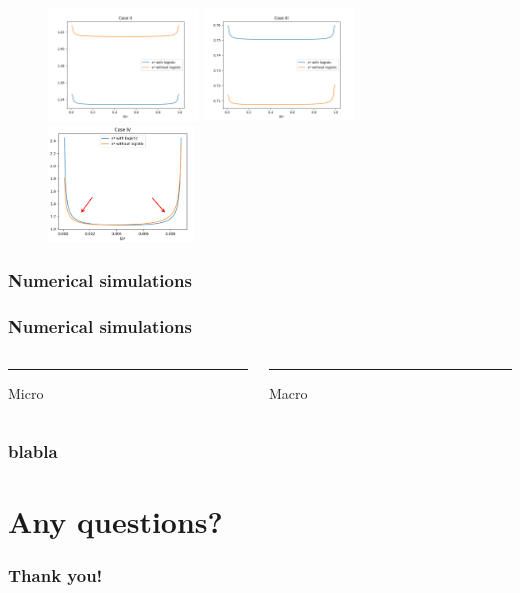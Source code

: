 \documentclass[10pt]{beamer}
\theoremstyle{remark}
\begin{document}
\begin{frame}
\begin{figure}
\includegraphics[width=4cm]{sstar_caseII}
\includegraphics[width=4cm]{sstar_caseIII}
\includegraphics[width=3.9cm]{caseIVmodi}

\end{figure}






\end{frame}




\begin{frame}
\frametitle{Numerical simulations}
\end{frame}


\begin{frame}
\frametitle{Numerical simulations}
\begin{columns}[T] %
	\begin{column}{.48\textwidth}
		\color{orange}\rule{\linewidth}{4pt}
		
		Micro
	\end{column}%
	\hfill%
	\begin{column}{.48\textwidth}
		\color{blue}\rule{\linewidth}{4pt}
		
		Macro
	\end{column}%
\end{columns}
\end{frame}

\begin{frame}
\frametitle{blabla}
\end{frame}




\section{Any questions?}
\begin{frame}
\frametitle{Thank you!}
\end{frame}
\end{document}
